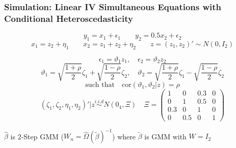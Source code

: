 \documentclass{beamer}
\begin{document}
\begin{frame}
\frametitle{Simulation: Linear IV Simultaneous Equations with Conditional Heteroscedasticity}
\begin{equation*} y_{1}=  x_{1} + \epsilon_{1} \qquad y_{2}=0.5 x_2+ \epsilon_{2} \end{equation*}
\begin{equation*} x_1 = z_2 +\eta_1 \qquad  x_2 =z_1+z_2 +\eta_2 \qquad z=(z_1,z_2)'\sim N(0,I_2)\end{equation*}

\begin{equation*}\epsilon_1=\vartheta_1z_1, \quad \epsilon_2=\vartheta_2 z_2\end{equation*}
\begin{equation*} \vartheta_{1}= \sqrt{\frac{1+\rho}{2}} \zeta_1 + \sqrt{\frac{1-\rho}{2}} \zeta_2, \quad\vartheta_2= \sqrt{\frac{1+\rho}{2}} \zeta_1 - \sqrt{\frac{1-\rho}{2}} \zeta_2\end{equation*}
\begin{equation*} \textrm{such that} \quad \textrm{cor}(\vartheta_1,\vartheta_2|z)=\rho\end{equation*}
\begin{equation*} (\zeta_1,\zeta_2,\eta_1, \eta_2)'|z \overset{i.i.d}{\sim} N(0_4, \Xi)\quad \Xi=\left(\begin{array}{cccc}  1 & 0 & 0.3 & 0 \\  0 & 1 & 0.5 & 0 \\ 0.3 & 0 &1 & 0 \\ 0 & 0.5 &0 & 1  \end{array} \right)\end{equation*}

 $\hat{\beta}$ is  2-Step GMM ($W_n=\hat{\Omega}(\tilde{\beta})^{-1}$) where $\tilde{\beta}$ is GMM  with $W=I_2$

\end{frame}
\end{document}
